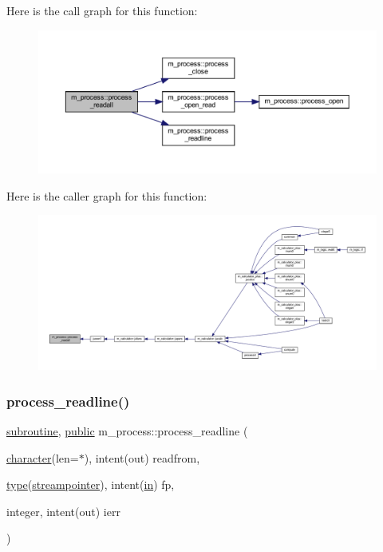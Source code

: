 Here is the call graph for this function\+:
\nopagebreak
\begin{figure}[H]
\begin{center}
\leavevmode
\includegraphics[width=350pt]{namespacem__process_a7dd759a1344789477ae1e205d7fa9a51_cgraph}
\end{center}
\end{figure}
Here is the caller graph for this function\+:
\nopagebreak
\begin{figure}[H]
\begin{center}
\leavevmode
\includegraphics[width=350pt]{namespacem__process_a7dd759a1344789477ae1e205d7fa9a51_icgraph}
\end{center}
\end{figure}
\mbox{\label{namespacem__process_acbc72c5ed371430a471aa1f3010fbbda}} 
\subsubsection{\texorpdfstring{process\+\_\+readline()}{process\_readline()}}
{\footnotesize\ttfamily \hyperlink{M__stopwatch_83_8txt_acfbcff50169d691ff02d4a123ed70482}{subroutine}, \hyperlink{M__stopwatch_83_8txt_a2f74811300c361e53b430611a7d1769f}{public} m\+\_\+process\+::process\+\_\+readline (\begin{DoxyParamCaption}\item[{\hyperlink{option__stopwatch_83_8txt_abd4b21fbbd175834027b5224bfe97e66}{character}(len=$\ast$), intent(out)}]{readfrom,  }\item[{\hyperlink{stop__watch_83_8txt_a70f0ead91c32e25323c03265aa302c1c}{type}(\hyperlink{structm__process_1_1streampointer}{streampointer}), intent(\hyperlink{M__journal_83_8txt_afce72651d1eed785a2132bee863b2f38}{in})}]{fp,  }\item[{integer, intent(out)}]{ierr }\end{DoxyParamCaption})}




